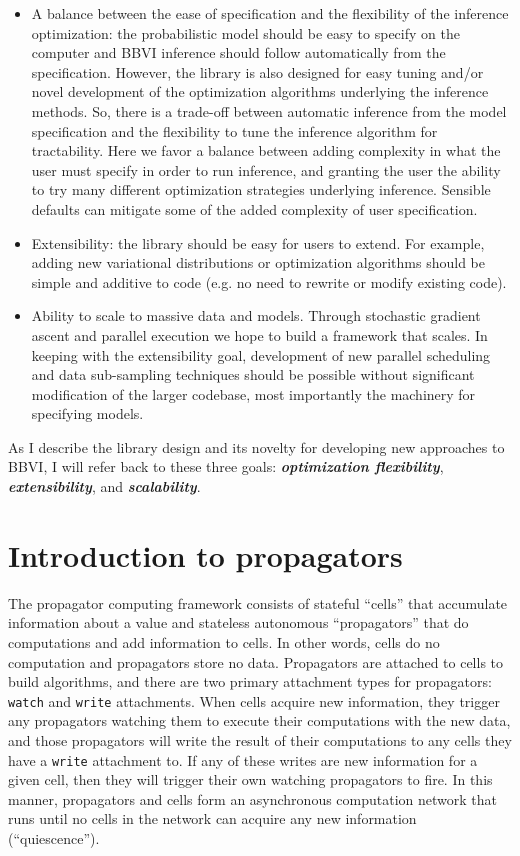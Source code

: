 \documentclass[12pt]{article}
\begin{document}
\begin{itemize}
\item A balance between the ease of specification and the flexibility
  of the inference optimization: the probabilistic model should be easy
  to specify on the computer and BBVI inference should follow
  automatically from the specification. However, the library is also
  designed for easy tuning and/or novel development of the optimization
  algorithms underlying the inference methods. So, there is a trade-off
  between automatic inference from the model specification and the
  flexibility to tune the inference algorithm for tractability. Here
  we favor a balance between adding complexity in what the user must
  specify in order to run inference, and granting the user the ability
  to try many different optimization strategies underlying
  inference. Sensible defaults can mitigate some of the added
  complexity of user specification.
\item Extensibility: the library should be easy for users to
  extend. For example, adding new variational distributions or
  optimization algorithms should be simple and additive to code
  (e.g. no need to rewrite or modify existing code).
\item Ability to scale to massive data and models. Through stochastic
  gradient ascent \citep[e.g.,][]{hoffman-2013, ranganath-2014,
    kuc-2017} and parallel execution we hope to build a framework that
  scales. In keeping with the extensibility goal, development of new
  parallel scheduling and data sub-sampling techniques should be
  possible without significant modification of the larger codebase,
  most importantly the machinery for specifying models.
\end{itemize}

As I describe the library design and its novelty for developing new
approaches to BBVI, I will refer back to these three goals:
\textbf{\emph{optimization flexibility}}, \textbf{\emph{extensibility}}, and \textbf{\emph{scalability}}.

\section{Introduction to propagators}

The propagator computing framework \citep{radul-2009} consists of
stateful ``cells'' that accumulate information about a value and
stateless autonomous ``propagators'' that do computations and add
information to cells. In other words, cells do no computation and
propagators store no data. Propagators are attached to
cells to build algorithms, and there are two primary attachment types for propagators:
\texttt{watch} and \texttt{write} attachments. When cells acquire new
information, they trigger any propagators watching them to execute
their computations with the new data, and those propagators will write
the result of their computations to any cells they have a
\texttt{write} attachment to. If any of these writes are new
information for a given cell, then they will trigger their own
watching propagators to fire. In this manner, propagators and cells
form an asynchronous computation network that runs until no cells in
the network can acquire any new information (``quiescence'').
\end{document}
